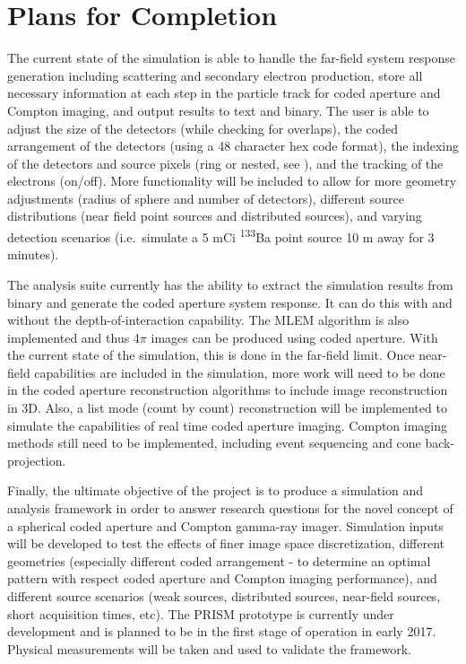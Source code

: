 \documentclass[10pt]{article}
\begin{document}
\section{Plans for Completion}

The current state of the simulation is able to handle the far-field system response generation including scattering and secondary electron production, store all necessary information at each step in the particle track for coded aperture and Compton imaging, and output results to text and binary. The user is able to adjust the size of the detectors (while checking for overlaps), the coded arrangement of the detectors (using a 48 character hex code format), the indexing of the detectors and source pixels (ring or nested, see \cite{Healpix2005}), and the tracking of the electrons (on/off). More functionality will be included to allow for more geometry adjustments (radius of sphere and number of detectors), different source distributions (near field point sources and distributed sources), and varying detection scenarios (i.e.~simulate a 5 mCi \textsuperscript{133}Ba point source 10 m away for 3 minutes).

The analysis suite currently has the ability to extract the simulation results from binary and generate the coded aperture system response. It can do this with and without the depth-of-interaction capability. The MLEM algorithm is also implemented and thus 4$\pi$ images can be produced using coded aperture. With the current state of the simulation, this is done in the far-field limit. Once near-field capabilities are included in the simulation, more work will need to be done in the coded aperture reconstruction algorithms to include image reconstruction in 3D. Also, a list mode (count by count) reconstruction will be implemented to simulate the capabilities of real time coded aperture imaging. Compton imaging methods still need to be implemented, including event sequencing and cone back-projection.

Finally, the ultimate objective of the project is to produce a simulation and analysis framework in order to answer research questions for the novel concept of a spherical coded aperture and Compton gamma-ray imager. Simulation inputs will be developed to test the effects of finer image space discretization, different geometries (especially different coded arrangement - to determine an optimal pattern with respect coded aperture and Compton imaging performance), and different source scenarios (weak sources, distributed sources, near-field sources, short acquisition times, etc). The PRISM prototype is currently under development and is planned to be in the first stage of operation in early 2017. Physical measurements will be taken and used to validate the framework.










\end{document}
